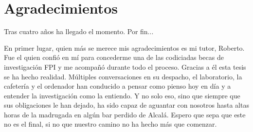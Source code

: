 %
%
%
% 
%
%
%
%

\thispagestyle{empty}

\chapter*{Agradecimientos}
\label{ch:agradecimientos}


Tras cuatro años ha llegado el momento.
Por fin...

En primer lugar, quien más se merece mis agradecimientos es mi tutor, Roberto.
Fue el quien confió en mí para concederme una de las codiciadas becas de investigación FPI y me acompañó durante todo el proceso.
Gracias a él esta tesis se ha hecho realidad.
Múltiples conversaciones en su despacho, el laboratorio, la cafetería y el ordenador han conducido a pensar como pienso hoy en día y a entender la investigación como la entiendo.
Y no solo eso, sino que siempre que sus obligaciones le han dejado, ha sido capaz de aguantar con nosotros hasta altas horas de la madrugada en algún bar perdido de Alcalá.
Espero que sepa que este no es el final, si no que nuestro camino no ha hecho más que comenzar.






